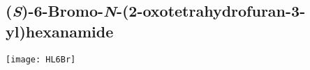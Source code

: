 
\subsection{(\textit{S})-6-Bromo-\textit{N}-(2-oxotetrahydrofuran-3-yl)hexanamide }


\begin{scheme}[H]
	\begin{center}
		\texttt{[image: HL6Br]}
	\end{center}
\end{scheme}

